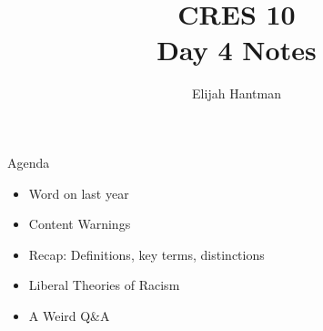 \documentclass{report}
\title{\Huge{CRES 10}\\Day 4 Notes}
\author{\huge{Elijah Hantman}}
\date{}
\begin{document}
\maketitle
\newpage

\begin{mdframed}
    {\LARGE Agenda}
    \begin{itemize}
        \item Word on last year
        \item Content Warnings
        \item Recap: Definitions, key terms, distinctions
        \item Liberal Theories of Racism
        \item A Weird Q\&A
    \end{itemize}
\end{mdframed}
\end{document}
